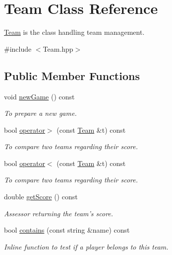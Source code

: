 \hypertarget{classTeam}{\section{\-Team \-Class \-Reference}
\label{classTeam}
}


\hyperlink{classTeam}{\-Team} is the class handling team management.  




{\ttfamily \#include $<$\-Team.\-hpp$>$}

\subsection*{\-Public \-Member \-Functions}
\begin{DoxyCompactItemize}
\item 
\hypertarget{classTeam_ad03ad0d41d61403a6f06e6742aca72d3}{void \hyperlink{classTeam_ad03ad0d41d61403a6f06e6742aca72d3}{new\-Game} () const }\label{classTeam_ad03ad0d41d61403a6f06e6742aca72d3}

\begin{DoxyCompactList}\small\item\em \-To prepare a new game. \end{DoxyCompactList}\item 
\hypertarget{classTeam_a3164302f1fd5d70db2e85994488f8054}{bool \hyperlink{classTeam_a3164302f1fd5d70db2e85994488f8054}{operator$>$} (const \hyperlink{classTeam}{\-Team} \&t) const }\label{classTeam_a3164302f1fd5d70db2e85994488f8054}

\begin{DoxyCompactList}\small\item\em \-To compare two teams regarding their score. \end{DoxyCompactList}\item 
\hypertarget{classTeam_a1811d6b7e660181d8209b455cb9d92e0}{bool \hyperlink{classTeam_a1811d6b7e660181d8209b455cb9d92e0}{operator$<$} (const \hyperlink{classTeam}{\-Team} \&t) const }\label{classTeam_a1811d6b7e660181d8209b455cb9d92e0}

\begin{DoxyCompactList}\small\item\em \-To compare two teams regarding their score. \end{DoxyCompactList}\item 
\hypertarget{classTeam_a57a775ba38aaf35510e412a01d6a3062}{double \hyperlink{classTeam_a57a775ba38aaf35510e412a01d6a3062}{get\-Score} () const }\label{classTeam_a57a775ba38aaf35510e412a01d6a3062}

\begin{DoxyCompactList}\small\item\em \-Assessor returning the team's score. \end{DoxyCompactList}\item 
bool \hyperlink{classTeam_ae3bc7f55a2204019bf393ccd110ce873}{contains} (const string \&name) const 
\begin{DoxyCompactList}\small\item\em \-Inline function to test if a player belongs to this team. \end{DoxyCompactList}\end{DoxyCompactItemize}

